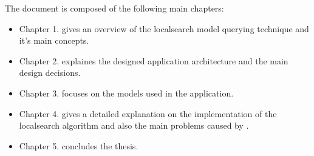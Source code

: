 The document is composed of the following main chapters:

\begin{itemize}
  \item Chapter 1. gives an overview of the localsearch model querying technique
  and it's main concepts.
  \item Chapter 2. explaines the designed application architecture and the main
  design decisions.
  \item Chapter 3. focuses on the models used in the application.
  \item Chapter 4. gives a detailed explanation on the implementation of the
  localsearch algorithm and also the main problems caused by \CPP{}.
  \item Chapter 5. concludes the thesis.
\end{itemize}